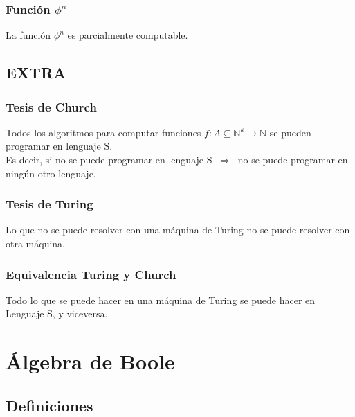 \documentclass{article}
\newcommand{\naturales}{\mathbb{N}}                     %
\newcommand{\Rightarrows}{\: \Rightarrow \:}            %
\begin{document}
\subsubsection{Función $\phi^n$}
La función $\phi^n$ es parcialmente computable.

\subsection{EXTRA}
\subsubsection*{Tesis de Church}
Todos los algoritmos para computar funciones $f: A \subseteq \naturales^k \rightarrow \naturales$ se pueden programar en lenguaje S. 
\\Es decir, si no se puede programar en lenguaje S $\Rightarrows$ no se puede programar en ningún otro lenguaje.

\subsubsection*{Tesis de Turing}
Lo que no se puede resolver con una máquina de Turing no se puede resolver con otra máquina.

\subsubsection*{Equivalencia Turing y Church}
Todo lo que se puede hacer en una máquina de Turing se puede hacer en Lenguaje S, y viceversa.

\newpage
\section{Álgebra de Boole}
\subsection{Definiciones}
\end{document}
